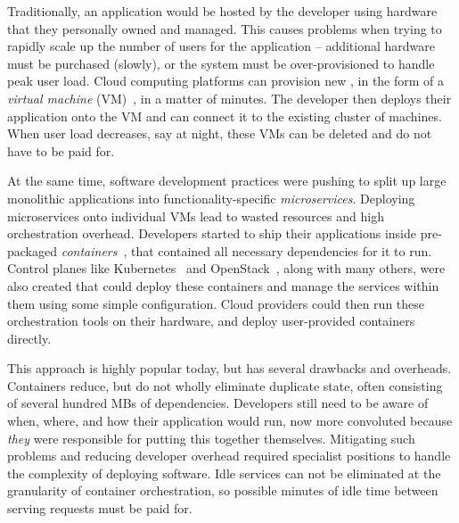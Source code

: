 Traditionally, an application would be hosted by the developer using hardware that they personally owned and managed.
This causes problems when trying to rapidly scale up the number of users for the application -- additional hardware must be purchased (slowly), or the system must be over-provisioned to handle peak user load.
Cloud computing platforms can provision new , in the form of a \emph{virtual machine} (VM)~\cite{xen}, in a matter of minutes.
The developer then deploys their application onto the VM and can connect it to the existing cluster of machines.
When user load decreases, say at night, these VMs can be deleted and do not have to be paid for.

At the same time, software development practices were pushing to split up large monolithic applications into functionality-specific \emph{microservices}.
Deploying microservices onto individual VMs lead to wasted resources and high orchestration overhead.
Developers started to ship their applications inside pre-packaged \emph{containers}~\cite{docker-main}, that contained all necessary dependencies for it to run.
Control planes like Kubernetes~\cite{kubernetes} and OpenStack~\cite{openstack}, along with many others, were also created that could deploy these containers and manage the services within them using some simple configuration.
Cloud providers could then run these orchestration tools on their hardware, and deploy user-provided containers directly.

This approach is highly popular today, but has several drawbacks and overheads.
Containers reduce, but do not wholly eliminate duplicate state, often consisting of several hundred MBs of dependencies.
Developers still need to be aware of when, where, and how their application would run, now more convoluted because \emph{they} were responsible for putting this together themselves.
Mitigating such problems and reducing developer overhead required specialist  positions to handle the complexity of deploying software. 
Idle services can not be eliminated at the granularity of container orchestration, so possible minutes of idle time between serving requests must be paid for.


